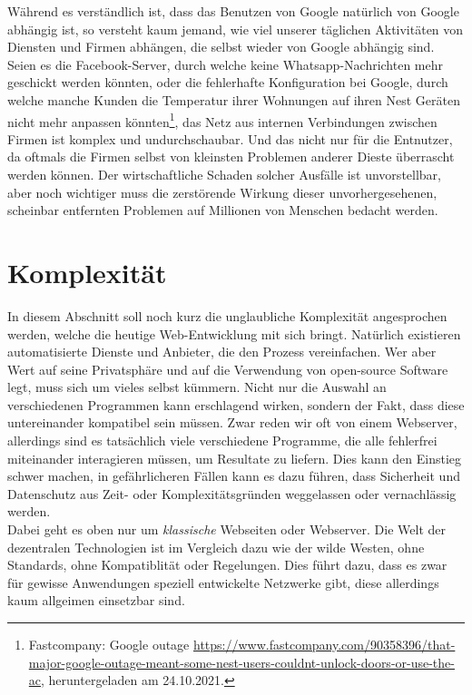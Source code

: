 \documentclass[a4paper,11pt,titlepage,twoside]{memoir}
\begin{document}
\noindent Während es verständlich ist, dass das Benutzen von Google
natürlich von Google abhängig ist, so versteht kaum jemand, wie viel
unserer täglichen Aktivitäten von Diensten und Firmen abhängen, die
selbst wieder von Google abhängig sind. Seien es die Facebook-Server,
durch welche keine Whatsapp-Nachrichten mehr geschickt werden könnten,
oder die fehlerhafte Konfiguration bei Google, durch welche manche
Kunden die Temperatur ihrer Wohnungen auf ihren Nest Geräten nicht
mehr anpassen könnten\footnote{Fastcompany: Google outage
\url{https://www.fastcompany.com/90358396/that-major-google-outage-meant-some-nest-users-couldnt-unlock-doors-or-use-the-ac},
heruntergeladen am 24.10.2021.}, das Netz aus internen Verbindungen
zwischen Firmen ist komplex und undurchschaubar. Und das nicht nur für
die Entnutzer, da oftmals die Firmen selbst von kleinsten Problemen
anderer Dieste überrascht werden können. Der wirtschaftliche Schaden
solcher Ausfälle ist unvorstellbar, aber noch wichtiger muss die
zerstörende Wirkung dieser unvorhergesehenen, scheinbar entfernten
Problemen auf Millionen von Menschen bedacht werden.
\section{Komplexität}
\label{sec:org408398a}
In diesem Abschnitt soll noch kurz die unglaubliche Komplexität
angesprochen werden, welche die heutige Web-Entwicklung mit sich
bringt. Natürlich existieren automatisierte Dienste und Anbieter, die
den Prozess vereinfachen. Wer aber Wert auf seine Privatsphäre und auf
die Verwendung von open-source Software legt, muss sich um vieles
selbst kümmern. Nicht nur die Auswahl an verschiedenen Programmen kann
erschlagend wirken, sondern der Fakt, dass diese untereinander
kompatibel sein müssen. Zwar reden wir oft von einem Webserver,
allerdings sind es tatsächlich viele verschiedene Programme, die alle
fehlerfrei miteinander interagieren müssen, um Resultate zu liefern.
Dies kann den Einstieg schwer machen, in gefährlicheren Fällen kann es
dazu führen, dass Sicherheit und Datenschutz aus Zeit- oder
Komplexitätsgründen weggelassen oder vernachlässig werden.\\

\noindent Dabei geht es oben nur um \emph{klassische} Webseiten oder
Webserver. Die Welt der dezentralen Technologien ist im Vergleich dazu
wie der wilde Westen, ohne Standards, ohne Kompatiblität oder
Regelungen. Dies führt dazu, dass es zwar für gewisse Anwendungen
speziell entwickelte Netzwerke gibt, diese allerdings kaum allgeimen
einsetzbar sind.
\end{document}
